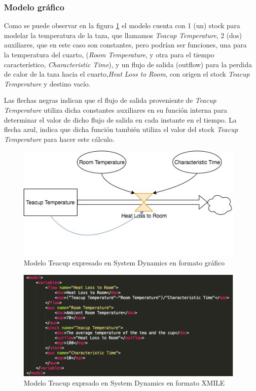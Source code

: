 \subsubsection{Modelo gráfico}
Como se puede observar en la figura \ref{fig:Teacup_sd} el modelo cuenta con 1 (un) stock para modelar la temperatura de la taza, que llamamos \textit{Teacup Temperature}, 2 (dos) auxiliares, que en este caso son constantes, pero podrían ser funciones, una para la temperatura del cuarto, (\textit{Room Temperature}, y otra para el tiempo característico, \textit{Characteristic Time}), y un flujo de salida (outflow) para la perdida de calor de la taza hacia el cuarto,\textit{Heat Loss to Room}, con origen el stock \textit{Teacup Temperature} y destino vacío. 

Las flechas negras indican que el flujo de salida proveniente de \textit{Teacup Temperature} utiliza dicha constantes auxiliares en su función interna para determinar el valor de dicho flujo de salida en cada instante en el tiempo. La flecha azul, indica que dicha función también utiliza el valor del stock \textit{Teacup Temperature} para hacer este cálculo. 

\begin{figure}[!h]
\centering
\includegraphics[scale=0.5]{imagenes/Teacup_sd.jpg}
\caption{Modelo Teacup expresado en System Dynamics en formato gráfico}
\label{fig:Teacup_sd}
\end{figure}

\begin{figure}[!h]
\centering
\includegraphics[scale=0.5]{imagenes/teacup_mapeo/Teacup_variables}
\caption{Modelo Teacup exprsado en System Dynamics en formato XMILE}
\label{fig:Teacup_xmile}
\end{figure}

